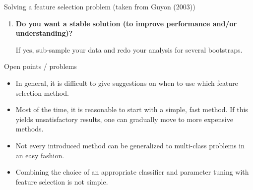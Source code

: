 \documentclass[11pt,compress,t,notes=noshow, xcolor=table]{beamer}
\begin{document}
\begin{vbframe}{Solving a feature selection problem (taken from Guyon (2003))}
\begin{enumerate}
      If yes, compare several feature selection methods, including your new idea, correlation coefficients, backward selection and embedded methods.
      Use linear and nonlinear predictors.
      Select the best approach via model selection.
      \item {\bf Do you want a stable solution (to improve performance and/or understanding)?}

      If yes, sub-sample your data and redo your analysis for several bootstraps.
    \end{enumerate}

  \end{vbframe}

  \begin{vbframe}{Open points / problems}

    \begin{itemize}
      \item In general, it is difficult to give suggestions on when to use which feature selection method.
      \item Most of the time, it is reasonable to start with a simple, fast method.
      If this yields unsatisfactory results, one can gradually move to more expensive methods.
      \item Not every introduced method can be generalized to multi-class problems in an easy fashion.
      \item Combining the choice of an appropriate classifier and parameter tuning with feature selection is not simple.
    \end{itemize}

  \end{vbframe}


  \endlecture
\end{document}
